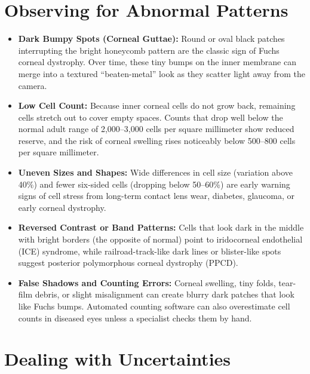 \section{Observing for Abnormal Patterns}

\begin{itemize}
    \item \textbf{Dark Bumpy Spots (Corneal Guttae):} Round or oval black patches interrupting the bright honeycomb pattern are the classic sign of Fuchs corneal dystrophy. Over time, these tiny bumps on the inner membrane can merge into a textured ``beaten-metal'' look as they scatter light away from the camera.
    \item \textbf{Low Cell Count:} Because inner corneal cells do not grow back, remaining cells stretch out to cover empty spaces. Counts that drop well below the normal adult range of 2,000--3,000 cells per square millimeter show reduced reserve, and the risk of corneal swelling rises noticeably below 500--800 cells per square millimeter.
    \item \textbf{Uneven Sizes and Shapes:} Wide differences in cell size (variation above 40\%) and fewer six-sided cells (dropping below 50--60\%) are early warning signs of cell stress from long-term contact lens wear, diabetes, glaucoma, or early corneal dystrophy.
    \item \textbf{Reversed Contrast or Band Patterns:} Cells that look dark in the middle with bright borders (the opposite of normal) point to iridocorneal endothelial (ICE) syndrome, while railroad-track-like dark lines or blister-like spots suggest posterior polymorphous corneal dystrophy (PPCD).
    \item \textbf{False Shadows and Counting Errors:} Corneal swelling, tiny folds, tear-film debris, or slight misalignment can create blurry dark patches that look like Fuchs bumps. Automated counting software can also overestimate cell counts in diseased eyes unless a specialist checks them by hand.
\end{itemize}

\section{Dealing with Uncertainties}

